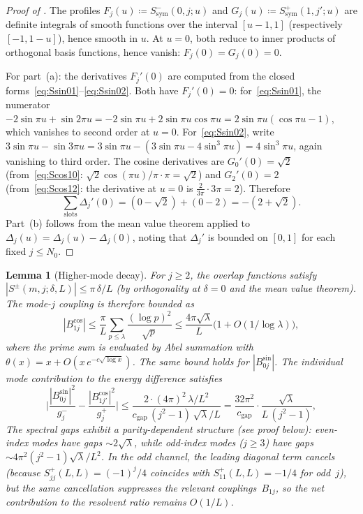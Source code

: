 \documentclass[12pt,a4paper]{article}
\newtheorem{lemma}[theorem]{Lemma}
\theoremstyle{definition}
\theoremstyle{remark}
\begin{document}
\begin{proof}[Proof of ]
The profiles $F_j(u) \coloneqq S^-_{\mathrm{sym}}(0,j;u)$ and $G_j(u) \coloneqq S^+_{\mathrm{sym}}(1,j';u)$ are definite integrals of smooth functions over the interval $[u-1,1]$ (respectively $[-1,1-u]$), hence smooth in $u$. At $u = 0$, both reduce to inner products of orthogonal basis functions, hence vanish: $F_j(0) = G_j(0) = 0$.

For part~(a): the derivatives $F_j'(0)$ are computed from the closed forms~\eqref{eq:Ssin01}--\eqref{eq:Ssin02}. Both have $F_j'(0) = 0$: for~\eqref{eq:Ssin01}, the numerator $-2\sin\pi u + \sin 2\pi u = -2\sin\pi u + 2\sin\pi u\cos\pi u = 2\sin\pi u(\cos\pi u - 1)$, which vanishes to second order at $u = 0$. For~\eqref{eq:Ssin02}, write $3\sin\pi u - \sin 3\pi u = 3\sin\pi u - (3\sin\pi u - 4\sin^3\pi u) = 4\sin^3\pi u$, again vanishing to third order. The cosine derivatives are $G_0'(0) = \sqrt{2}$ (from~\eqref{eq:Scos10}: $\sqrt{2}\cos(\pi u)/\pi \cdot \pi = \sqrt{2}$) and $G_2'(0) = 2$ (from~\eqref{eq:Scos12}: the derivative at $u = 0$ is $\tfrac{2}{3\pi}\cdot 3\pi = 2$). Therefore
\[
  \sum_{\mathrm{slots}} \Delta_j'(0) = (0 - \sqrt{2}) + (0 - 2) = -(2 + \sqrt{2}).
\]
Part~(b) follows from the mean value theorem applied to $\Delta_j(u) = \Delta_j(u) - \Delta_j(0)$, noting that $\Delta_j'$ is bounded on $[0,1]$ for each fixed $j \leq N_0$.
\end{proof}

\begin{lemma}[Higher-mode decay]
\label{lem:higher-mode-decay}
For $j \geq 2$, the overlap functions satisfy $|S^{\pm}(m,j;\delta,L)| \leq \pi\,\delta/L$ (by orthogonality at $\delta = 0$ and the mean value theorem). The mode-$j$ coupling is therefore bounded as
\[
  |B_{1j}^{\cos}| \leq \frac{\pi}{L}\sum_{p \leq \lambda}\frac{(\log p)^2}{\sqrt{p}}
  \leq \frac{4\pi\sqrt{\lambda}}{L}\bigl(1 + O(1/\log\lambda)\bigr),
\]
where the prime sum is evaluated by Abel summation with $\theta(x) = x + O(x\,e^{-c\sqrt{\log x}})$. The same bound holds for $|B_{0j}^{\sin}|$. The individual mode contribution to the energy difference satisfies
\[
  \biggl|\frac{|B_{0j}^{\sin}|^2}{g_j^-} - \frac{|B_{1j'}^{\cos}|^2}{g_j^+}\biggr|
  \leq \frac{2 \cdot (4\pi)^2 \,\lambda/L^2}{c_{\mathrm{gap}}\,(j^2-1)\,\sqrt{\lambda}/L}
  = \frac{32\pi^2}{c_{\mathrm{gap}}}\cdot\frac{\sqrt{\lambda}}{L\,(j^2-1)},
\]
The spectral gaps exhibit a \emph{parity-dependent} structure (see proof below): even-index modes have gaps $\sim 2\sqrt{\lambda}$, while odd-index modes ($j \geq 3$) have gaps $\sim 4\pi^2(j^2-1)\sqrt{\lambda}/L^2$. In the odd channel, the leading diagonal term cancels (because $S_{jj}^+(L,L) = (-1)^j/4$ coincides with $S_{11}^+(L,L) = -1/4$ for odd~$j$), but the same cancellation suppresses the relevant couplings~$B_{1j}$, so the net contribution to the resolvent ratio remains $O(1/L)$.
\end{lemma}
\end{document}
